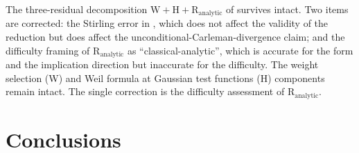 \begin{remark}
\label{v4-arith:r-audit:rem:not-downgrade}
The three-residual decomposition \(\mathrm{W}+\mathrm{H}+
\mathrm{R}_{\mathrm{analytic}}\) of
 survives intact. Two
items are corrected: the Stirling error in
, which does not
affect the validity of the reduction but does affect the
unconditional-Carleman-divergence claim; and the difficulty
framing of \(\mathrm{R}_{\mathrm{analytic}}\) as
``classical-analytic'', which is accurate for the form and the
implication direction but inaccurate for the difficulty. The weight
selection (W) and Weil formula at Gaussian test functions (H)
components remain intact. The single correction is the difficulty
assessment of \(\mathrm{R}_{\mathrm{analytic}}\).
\end{remark}

\section{Conclusions}
\label{v4-arith:r-audit:summary}

